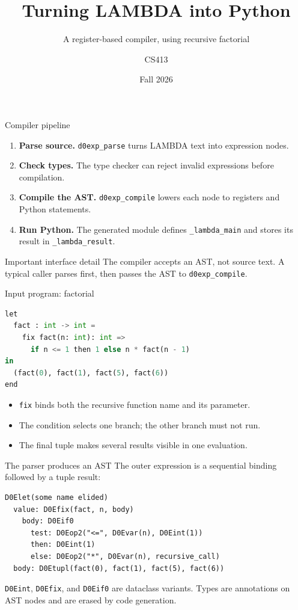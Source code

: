 \documentclass[aspectratio=169,10pt]{beamer}
\title{Turning LAMBDA into Python}
\subtitle{A register-based compiler, using recursive factorial}
\author{CS413}
\date{Fall 2026}
\begin{document}
\begin{frame}[plain]
  \titlepage
\end{frame}

\begin{frame}{Compiler pipeline}
  \begin{enumerate}
    \item \textbf{Parse source.} \texttt{d0exp\_parse} turns LAMBDA text into expression nodes.
    \item \textbf{Check types.} The type checker can reject invalid expressions before compilation.
    \item \textbf{Compile the AST.} \texttt{d0exp\_compile} lowers each node to registers and Python statements.
    \item \textbf{Run Python.} The generated module defines \texttt{\_lambda\_main} and stores its result in \texttt{\_lambda\_result}.
  \end{enumerate}
  \vspace{0.6em}
  \begin{block}{Important interface detail}
    The compiler accepts an AST, not source text. A typical caller parses first, then passes the AST to \texttt{d0exp\_compile}.
  \end{block}
\end{frame}

\begin{frame}[fragile]{Input program: factorial}
  \begin{lstlisting}[language=Python]
let
  fact : int -> int =
    fix fact(n: int): int =>
      if n <= 1 then 1 else n * fact(n - 1)
in
  (fact(0), fact(1), fact(5), fact(6))
end
  \end{lstlisting}
  \vspace{0.3em}
  \begin{itemize}
    \item \texttt{fix} binds both the recursive function name and its parameter.
    \item The condition selects one branch; the other branch must not run.
    \item The final tuple makes several results visible in one evaluation.
  \end{itemize}
\end{frame}

\begin{frame}[fragile]{The parser produces an AST}
  The outer expression is a sequential binding followed by a tuple result:
  \begin{lstlisting}
D0Elet(some name elided)
  value: D0Efix(fact, n, body)
    body: D0Eif0
      test: D0Eop2("<=", D0Evar(n), D0Eint(1))
      then: D0Eint(1)
      else: D0Eop2("*", D0Evar(n), recursive_call)
  body: D0Etupl(fact(0), fact(1), fact(5), fact(6))
  \end{lstlisting}
  \vspace{0.3em}
  \texttt{D0Eint}, \texttt{D0Efix}, and \texttt{D0Eif0} are dataclass variants. Types are annotations on AST nodes and are erased by code generation.
\end{frame}
\end{document}

